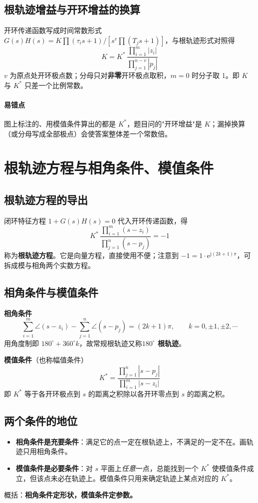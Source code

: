 \subsection{根轨迹增益与开环增益的换算}
开环传递函数写成时间常数形式 $G(s)H(s)=K\prod(\tau_i s+1)\big/\left[s^{v}\prod(T_j s+1)\right]$，与根轨迹形式对照得
\[
K=K^*\,\frac{\displaystyle\prod_{i=1}^{m}|z_i|}{\displaystyle\prod_{j=1}^{n-v}|p_j|}
\]
$v$ 为原点处开环极点数；分母只对\textbf{非零}开环极点取积，$m=0$ 时分子取 1。即 $K$ 与 $K^*$ 只差一个比例常数。

\paragraph{易错点}图上标注的、用模值条件算出的都是 $K^*$，题目问的"开环增益"是 $K$；漏掉换算（或分母写成全部极点）会使答案整体差一个常数倍。

\medskip

\section{根轨迹方程与相角条件、模值条件}
\subsection{根轨迹方程的导出}
闭环特征方程 $1+G(s)H(s)=0$ 代入开环传递函数，得
\[
K^*\,\frac{\prod_{i=1}^{m}(s-z_i)}{\prod_{j=1}^{n}(s-p_j)}=-1
\]
称为\textbf{根轨迹方程}。它是向量方程，直接使用不便；注意到 $-1=1\cdot\mathrm{e}^{\mathrm{j}(2k+1)\pi}$，可拆成模与相角两个实数方程。

\subsection{相角条件与模值条件}
\textbf{相角条件}
\[
\sum_{i=1}^{m}\angle(s-z_i)-\sum_{j=1}^{n}\angle(s-p_j)=(2k+1)\pi,
\qquad k=0,\pm1,\pm2,\cdots
\]
用角度制即 $180^\circ+360^\circ k$，故常规根轨迹又称\textbf{$180^\circ$ 根轨迹}。

\textbf{模值条件}（也称幅值条件）
\[
K^*=\frac{\displaystyle\prod_{j=1}^{n}|s-p_j|}{\displaystyle\prod_{i=1}^{m}|s-z_i|}
\]
即 $K^*$ 等于各开环极点到 $s$ 的距离之积除以各开环零点到 $s$ 的距离之积。

\subsection{两个条件的地位}
\begin{itemize}
    \item \textbf{相角条件是充要条件}：满足它的点一定在根轨迹上，不满足的一定不在。画轨迹只用相角条件。
    \item \textbf{模值条件是必要条件}：对 $s$ 平面上\emph{任意}一点，总能找到一个 $K^*$ 使模值条件成立，但该点未必在轨迹上。模值条件只用来确定轨迹上某点对应的 $K^*$。
\end{itemize}
概括：\textbf{相角条件定形状，模值条件定参数。}

